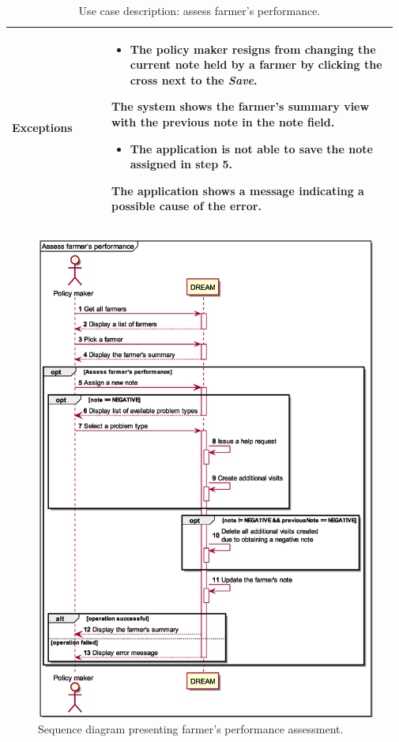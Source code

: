 \begin{table}[H]
\begin{tabular}{@{}p{0.25\linewidth} p{0.72\linewidth}@{}}
		\textbf{Exceptions}         & \begin{itemize}[leftmargin=.4cm,noitemsep,topsep=0pt,before=\vspace{-3mm}]
		   \item The policy maker resigns from changing the current note held by a farmer by clicking the cross next to the \textit{Save}. 
		\end{itemize}
	    The system shows the farmer's summary view with the previous note in the note field.
	    \begin{itemize}[leftmargin=.4cm,noitemsep,topsep=0pt]
		   \item The application is not able to save the note assigned in step 5.
		\end{itemize}
		The application shows a message indicating a possible cause of the error.
		\\\bottomrule
	\end{tabular}
	\caption{Use case description: assess farmer's performance.} 
\end{table}

\begin{figure}[H]
    \centering
    \includegraphics[scale=0.6, keepaspectratio, origin=c]{diagrams/sequence/assess_farmers_performance}
    \caption{Sequence diagram presenting farmer's performance assessment.}
    \label{fig:sd_assess_farmers_performance}
\end{figure}

